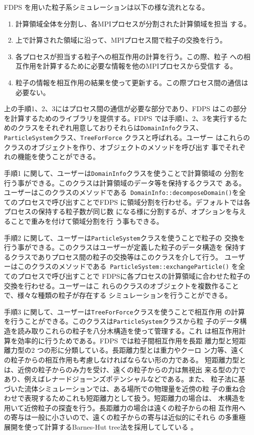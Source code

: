 \documentclass[a4j]{jarticle}
\begin{document}
FDPS を用いた粒子系シミュレーションは以下の様な流れとなる。

\begin{enumerate}
  \item 計算領域全体を分割し、各MPIプロセスが分割された計算領域を担当
    する。
  \item 上で計算された領域に沿って、MPIプロセス間で粒子の交換を行う。
  \item 各プロセスが担当する粒子への相互作用の計算を行う。この際、粒子
    への相互作用を計算するために必要な情報を他のMPIプロセスから受信す
    る。
  \item 粒子の情報を相互作用の結果を使って更新する。この際プロセス間の通信は必要ない。
\end{enumerate}

上の手順1、2、3にはプロセス間の通信が必要な部分であり、FDPS はこの部分
を計算するためのライブラリを提供する。FDPS では手順1、2、3を実行するた
めのクラスをそれぞれ用意しておりそれらは{\tt DomainInfo}クラス、{\tt
  ParticleSystem}クラス、{\tt TreeForForce} クラスと呼ばれる。ユーザー
はこれらのクラスのオブジェクトを作り、オブジェクトのメソッドを呼び出す
事でそれぞれの機能を使うことができる。

手順1 に関して、ユーザーは{\tt DomainInfo}クラスを使うことで計算領域の
分割を行う事ができる。このクラスは計算領域のデータ等を保持するクラスで
ある。ユーザーはこのクラスのメソッドである{\tt
  DomainInfo::decomposeDomain()}を全てのプロセスで呼び出すことでFDPS
に領域分割を行わせる。デフォルトでは各プロセスの保持する粒子数が同じ数
になる様に分割するが、オプションを与えることで重みを付けて領域分割を行
う事もできる。

手順2 に関して、ユーザーは{\tt ParticleSystem}クラスを使うことで粒子の
交換を行う事ができる。このクラスはユーザーが定義した粒子のデータ構造を
保持するクラスでありプロセス間の粒子の交換等はこのクラスを介して行う。
ユーザーはこのクラスのメソッドである{\tt
  ParticleSystem::exchangeParticle()} を全てのプロセスで呼び出すことで
FDPSに各プロセスの計算領域に合わせた粒子の交換を行わせる。ユーザーはこ
れらのクラスのオブジェクトを複数作ることで、様々な種類の粒子が存在する
シミュレーションを行うことができる。

手順3 に関して、ユーザーは{\tt TreeForForce}クラスを使うことで相互作用
の計算を行うことができる。このクラスは{\tt ParticleSystem}クラスから粒
子のデータ構造を読み取りこれらの粒子を八分木構造を使って管理する。これ
は相互作用計算を効率的に行うためである。FDPS では粒子間相互作用を長距
離力型と短距離力型の2 つの形に分類している。長距離力型とは重力やクーロ
ン力等、遠くの粒子からの相互作用も考慮しなければならない形の力である。
短距離力型とは、近傍の粒子からのみ力を受け、遠くの粒子からの力は無視出
来る型の力であり、例えばレナードジョーンズポテンシャルなどである。また、
粒子法に基づいた流体シミュレーションでは、ある場所での物理量を近傍の粒
子の重ね合わせで表現するためこれも短距離力として扱う。短距離力の場合は、
木構造を用いて近傍粒子の探査を行う。長距離力の場合は遠くの粒子からの相
互作用への寄与は一般に小さいので、遠くの粒子からの寄与は近似的にそれら
の多重極展開を使って計算するBarnes-Hut tree法を採用してしている
\cite{1986Natur.324..446B}。
\end{document}

